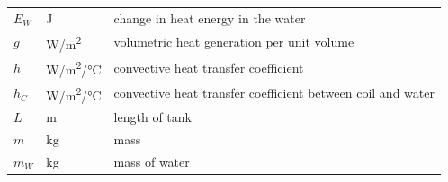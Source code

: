 \documentclass[12pt]{article}
\begin{document}
\begin{longtable*}{l l p{12cm}}
  $E_W$ & \si[per-mode=symbol] {\joule} & change in heat energy in the water
  \\ 
  $g$ & \si[per-mode=symbol] {\watt \per \square \metre} & volumetric heat
  generation per unit volume
  \\
  $h$ & \si[per-mode=symbol] {\watt\per\square\metre\per\celsius} & convective 
  heat transfer coefficient
  \\ 
  $h_C$ & \si[per-mode=symbol] {\watt\per \square \meter\per \celsius} &
  convective heat transfer coefficient between coil and water
  \\
  $L$ & \si{\metre} & length of tank
  \\
  $m$ & \si[per-mode=symbol] {\kilo\gram} & mass
  \\
  $m_W$ & \si[per-mode=symbol] {\kilo\gram} & mass of water
  \\


\end{longtable*}
\end{document}
